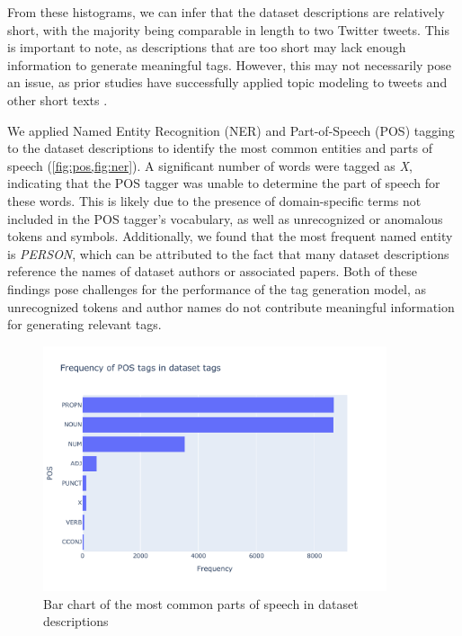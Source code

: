 From these histograms, we can infer that the dataset descriptions are relatively short, with the majority being comparable in length to two Twitter tweets. This is important to note, as descriptions that are too short may lack enough information to generate meaningful tags. However, this may not necessarily pose an issue, as prior studies have successfully applied topic modeling to tweets and other short texts \cite{cataldi_emerging_2010, churchill_percolation-based_2020, curiskis_evaluation_2020, kasiviswanathan_emerging_2011, paul_discovering_2014, yin_dirichlet_2014}.

We applied Named Entity Recognition (NER) and Part-of-Speech (POS) tagging to the dataset descriptions to identify the most common entities and parts of speech (\cref{fig:pos,fig:ner}). A significant number of words were tagged as \textit{X}, indicating that the POS tagger was unable to determine the part of speech for these words. This is likely due to the presence of domain-specific terms not included in the POS tagger's vocabulary, as well as unrecognized or anomalous tokens and symbols. Additionally, we found that the most frequent named entity is \textit{PERSON}, which can be attributed to the fact that many dataset descriptions reference the names of dataset authors or associated papers. Both of these findings pose challenges for the performance of the tag generation model, as unrecognized tokens and author names do not contribute meaningful information for generating relevant tags.

\begin{figure}[h]
    \centering
    \includegraphics[width=0.9\textwidth]{figures/pos.pdf}
    \caption{Bar chart of the most common parts of speech in dataset descriptions}
    \label{fig:pos}
\end{figure}

